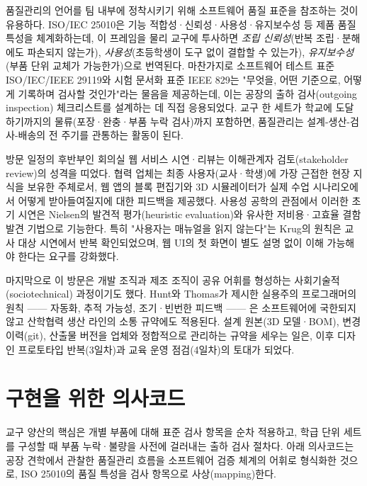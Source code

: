 품질관리의 언어를 팀 내부에 정착시키기 위해 소프트웨어 품질 표준을 참조하는 것이 유용하다. ISO/IEC 25010은 기능 적합성·신뢰성·사용성·유지보수성 등 제품 품질 특성을 체계화하는데\cite{iso25010}, 이 프레임을 물리 교구에 투사하면 \emph{조립 신뢰성}(반복 조립·분해에도 파손되지 않는가), \emph{사용성}(초등학생이 도구 없이 결합할 수 있는가), \emph{유지보수성}(부품 단위 교체가 가능한가)으로 번역된다. 마찬가지로 소프트웨어 테스트 표준 ISO/IEC/IEEE 29119\cite{iso29119}와 시험 문서화 표준 IEEE 829\cite{ieee829}는 "무엇을, 어떤 기준으로, 어떻게 기록하며 검사할 것인가"라는 물음을 제공하는데, 이는 공장의 출하 검사(outgoing inspection) 체크리스트를 설계하는 데 직접 응용되었다. 교구 한 세트가 학교에 도달하기까지의 물류(포장·완충·부품 누락 검사)까지 포함하면, 품질관리는 설계-생산-검사-배송의 전 주기를 관통하는 활동이 된다.

방문 일정의 후반부인 회의실 웹 서비스 시연·리뷰는 이해관계자 검토(stakeholder review)의 성격을 띠었다. 협력 업체는 최종 사용자(교사·학생)에 가장 근접한 현장 지식을 보유한 주체로서, 웹 앱의 블록 편집기와 3D 시뮬레이터가 실제 수업 시나리오에서 어떻게 받아들여질지에 대한 피드백을 제공했다. 사용성 공학의 관점에서 이러한 초기 시연은 Nielsen의 발견적 평가(heuristic evaluation)와 유사한 저비용·고효율 결함 발견 기법으로 기능한다\cite{nielsen1994heuristics, nielsen1993usability}. 특히 "사용자는 매뉴얼을 읽지 않는다"는 Krug의 원칙\cite{krug2014dontmakemethink}은 교사 대상 시연에서 반복 확인되었으며, 웹 UI의 첫 화면이 별도 설명 없이 이해 가능해야 한다는 요구를 강화했다.

마지막으로 이 방문은 개발 조직과 제조 조직이 공유 어휘를 형성하는 사회기술적(sociotechnical) 과정이기도 했다. Hunt와 Thomas가 제시한 실용주의 프로그래머의 원칙 —— 자동화, 추적 가능성, 조기·빈번한 피드백 —— 은 소프트웨어에 국한되지 않고 산학협력 생산 라인의 소통 규약에도 적용된다\cite{hunt1999pragmatic}. 설계 원본(3D 모델·BOM), 변경 이력(git), 산출물 버전을 업체와 정합적으로 관리하는 규약을 세우는 일은, 이후 디자인 프로토타입 반복(3일차)과 교육 운영 점검(4일차)의 토대가 되었다.

\section{구현을 위한 의사코드}

교구 양산의 핵심은 개별 부품에 대해 표준 검사 항목을 순차 적용하고, 학급 단위 세트를 구성할 때 부품 누락·불량을 사전에 걸러내는 출하 검사 절차다. 아래 의사코드는 공장 견학에서 관찰한 품질관리 흐름을 소프트웨어 검증 체계의 어휘로 형식화한 것으로, ISO 25010의 품질 특성을 검사 항목으로 사상(mapping)한다.

